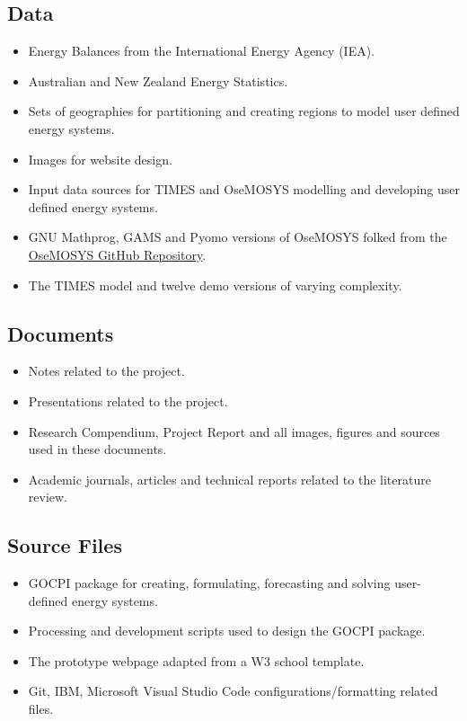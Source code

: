 \documentclass[12pt]{article}
\begin{document}
\subsection{Data}
\begin{itemize}
	\item Energy Balances from the International Energy Agency (IEA).
	\item Australian and New Zealand Energy Statistics.
	\item Sets of geographies for partitioning and creating regions to model user defined energy systems.
	\item Images for website design.
	\item Input data sources for TIMES and OseMOSYS modelling and developing user defined energy systems.
	\item GNU Mathprog, GAMS and Pyomo versions of OseMOSYS folked from the \href{https://github.com/OSeMOSYS/OSeMOSYS}{OseMOSYS GitHub Repository}.
	\item The TIMES model and twelve demo versions of varying complexity.
\end{itemize}
\subsection{Documents}
\begin{itemize}
	\item Notes related to the project.
	\item Presentations related to the project.
	\item Research Compendium, Project Report and all images, figures and sources used in these documents.
	\item Academic journals, articles and technical reports related to the literature review.
\end{itemize}
\subsection{Source Files}
\begin{itemize}
	\item GOCPI package for creating, formulating, forecasting and solving user-defined energy systems.
	\item Processing and development scripts used to design the GOCPI package.
	\item The prototype webpage adapted from a W3 school template.
	\item Git, IBM, Microsoft Visual Studio Code configurations/formatting related files.
\end{itemize}
\end{document}
